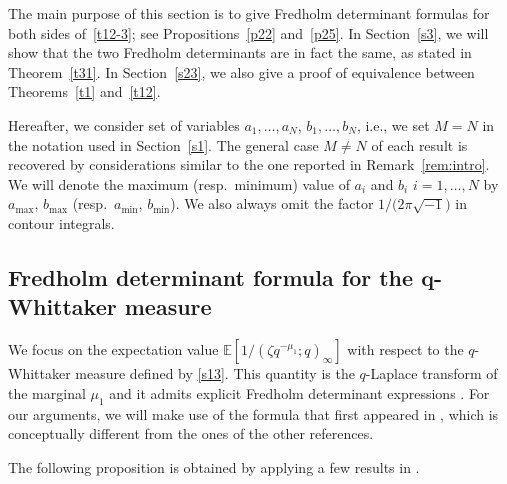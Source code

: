 \documentclass[pdftex]{sigma}
\numberwithin{equation}{section}
\newcommand{\E}[1]{\widetilde{e}_{#1}}
\def\E{\mathbb{E}}
\def\i{\infty}
\begin{document}
The main purpose of this section is to give Fredholm determinant formulas for both sides of~\eqref{t12-3}; see Propositions~\ref{p22} and~\ref{p25}.
In Section~\ref{s3}, we will show that the two Fredholm determinants are in fact the same,
as stated in Theorem~\ref{t31}. In Section~\ref{s23}, we also give a proof of equivalence between Theorems~\ref{t1} and~\ref{t12}.

Hereafter, we consider set of variables $a_1,\dots,a_N$, $b_1,\dots,b_N$, i.e., we set $M=N$ in the notation used in Section~\ref{s1}. The general case $M \neq N$ of each result is recovered by considerations similar to the one reported in Remark~\ref{rem:intro}. We will denote the maximum (resp.\ minimum) value of $a_i$ and $b_i$ $i=1,\dots,N$ by $a_{\max}$, $b_{\max}$ (resp.\ $a_{\min}$, $b_{\min}$). We also always omit the factor $1/\big(2\pi \sqrt{-1}\big)$ in contour integrals.

\subsection[Fredholm determinant formula for the q-Whittaker measure]{Fredholm determinant formula for the $\boldsymbol{q}$-Whittaker measure}
\label{s21}

We focus on the expectation value $\E[1/(\zeta q^{-\mu_1};q)_{\i}]$ with respect to the $q$-Whittaker measure defined by \eqref{s13}. This quantity is the $q$-Laplace transform of the marginal $\mu_1$ and it admits explicit Fredholm determinant expressions \cite{BorodinCorwin2014Mac,BoCoFeVe2015,BufetovMucciconiPetrov2019,ImamuraSasamoto2019qTASEPtheta,MatveevPetrov2015}. For our arguments, we will make use of the formula that first appeared in \cite{ImamuraSasamoto2019qTASEPtheta}, which is conceptually different from the ones of the other references.

The following proposition is obtained by applying a few results
in \cite{ImamuraSasamoto2019qTASEPtheta}.
\end{document}
